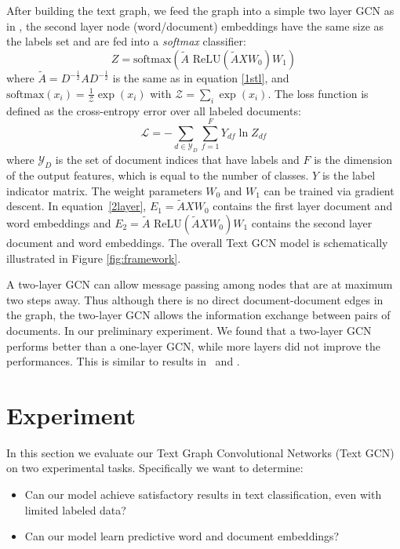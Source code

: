 \documentclass[letterpaper]{article} \usepackage{aaai19}  \usepackage{times}  \usepackage{helvet}  \usepackage{courier}  \usepackage{url}  \usepackage{graphicx}  \frenchspacing  \usepackage{amsmath}
\begin{document}
After building the text graph, we feed the graph into a simple two layer GCN as in \cite{kipf2017semi}, the second layer node (word/document) embeddings have the same size as the labels set and are fed into a \textit{softmax} classifier:
\begin{equation}
Z = \text{softmax}(\tilde{A}\text{ ReLU}(\tilde{A}XW_0)W_1)
\label{2layer}
\end{equation}
where $\tilde{A} = D^{-\frac{1}{2}}A D^{-\frac{1}{2}}$ is the same as in equation \ref{1stl}, and $\text{softmax}(x_i) = \frac{1}{\mathcal{Z}} \exp(x_i)$ with $\mathcal{Z} = \sum_i \exp(x_i)$. The loss function is defined as the cross-entropy error over all labeled documents:
\begin{equation}
\mathcal{L} = -\sum_{d \in \mathcal{Y}_D} \sum_{f=1}^F Y_{df} \ln Z_{df}
\end{equation}
where $\mathcal{Y}_D$ is the set of document indices that have labels and $F$ is the dimension of the output features, which is equal to the number of classes. $Y$ is the label indicator matrix. The weight parameters $W_0$ and $W_1$ can be trained via gradient descent. In equation~\ref{2layer}, $E_1 = \tilde{A}XW_0$ contains the first layer document and word embeddings and $E_2 = \tilde{A}\text{ ReLU}(\tilde{A}XW_0)W_1$ contains the second layer document and word embeddings. The overall Text GCN model is schematically illustrated in Figure \ref{fig:framework}.


A two-layer GCN can allow message passing among nodes that are at maximum two steps away. Thus although there is no direct document-document edges in the graph, the two-layer GCN allows the information exchange between pairs of documents.
In our preliminary experiment. We found that a two-layer GCN performs better than a one-layer GCN, while more layers did not improve the performances. This is similar to results in~\cite{kipf2017semi} and \cite{DBLP:conf/aaai/LiHW18}.















\section{Experiment}
In this section we evaluate our Text Graph Convolutional Networks (Text GCN) on two experimental tasks. Specifically we want to determine:
\begin{itemize}
  \item Can our model achieve satisfactory results in text classification, even with limited labeled data?
  \item Can our model learn predictive word and document embeddings?
  \end{itemize}
\end{document}
